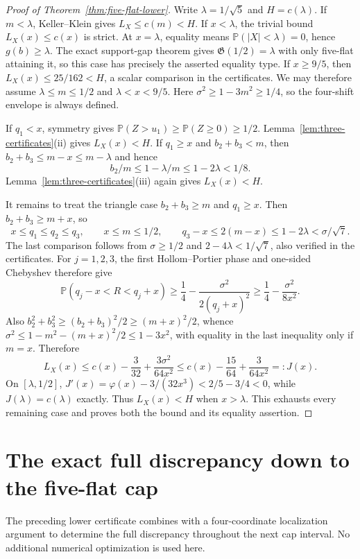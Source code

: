 \documentclass[11pt]{article}
\theoremstyle{remark}\newtheorem{remark}[theorem]{Remark}
\newcommand{\Pp}{\mathbb P}
\begin{document}
\begin{proof}[Proof of Theorem~\ref{thm:five-flat-lower}]
Write $\lambda=1/\sqrt5$ and $H=c(\lambda)$.
If $m<\lambda$, Keller--Klein gives $L_X\le c(m)<H$.
If $x<\lambda$, the trivial bound $L_X(x)\le c(x)$ is strict.
At $x=\lambda$, equality means $\Pp(|X|<\lambda)=0$, hence
$g(b)\ge\lambda$. The exact support-gap theorem gives
$\mathfrak G(1/2)=\lambda$ with only five-flat attaining it,
so this case has precisely the asserted equality type. If $x\ge9/5$, then
$L_X(x)\le25/162<H$, a scalar comparison in the certificates.
We may therefore assume $\lambda\le m\le1/2$ and
$\lambda<x<9/5$. Here $\sigma^2\ge1-3m^2\ge1/4$,
so the four-shift envelope is always defined.

If $q_1<x$, symmetry gives
$\Pp(Z>u_1)\ge\Pp(Z\ge0)\ge1/2$.
Lemma~\ref{lem:three-certificates}(ii) gives $L_X(x)<H$.
If $q_1\ge x$ and $b_2+b_3<m$, then
$b_2+b_3\le m-x\le m-\lambda$ and hence
\[
 b_2/m\le1-\lambda/m\le1-2\lambda<1/8.
\]
Lemma~\ref{lem:three-certificates}(iii) again gives $L_X(x)<H$.

It remains to treat the triangle case $b_2+b_3\ge m$ and $q_1\ge x$.
Then $b_2+b_3\ge m+x$, so
\[
 x\le q_1\le q_2\le q_3,\qquad x\le m\le1/2,\qquad
 q_3-x\le2(m-x)\le1-2\lambda<\sigma/\sqrt7.
\]
The last comparison follows from $\sigma\ge1/2$ and
$2-4\lambda<1/\sqrt7$, also verified in the certificates.
For $j=1,2,3$, the first Hollom--Portier phase and one-sided Chebyshev
therefore give
\[
 \Pp(q_j-x<R<q_j+x)
 \ge\frac14-\frac{\sigma^2}{2(q_j+x)^2}
 \ge\frac14-\frac{\sigma^2}{8x^2}.
\]
Also $b_2^2+b_3^2\ge(b_2+b_3)^2/2\ge(m+x)^2/2$, whence
$\sigma^2\le1-m^2-(m+x)^2/2\le1-3x^2$, with equality
in the last inequality only if $m=x$. Therefore
\[
 L_X(x)\le c(x)-\frac3{32}+\frac{3\sigma^2}{64x^2}
 \le c(x)-\frac{15}{64}+\frac3{64x^2}=:J(x).
\]
On $[\lambda,1/2]$,
$J'(x)=\varphi(x)-3/(32x^3)<2/5-3/4<0$, while
$J(\lambda)=c(\lambda)$ exactly. Thus $L_X(x)<H$ when
$x>\lambda$. This exhausts every remaining case and proves both the bound and
its equality assertion.
\end{proof}

\section{The exact full discrepancy down to the five-flat cap}\label{sec:four-core-full}
The preceding lower certificate combines with a four-coordinate
localization argument to determine the full discrepancy throughout the
next cap interval. No additional numerical optimization is used here.
\end{document}
